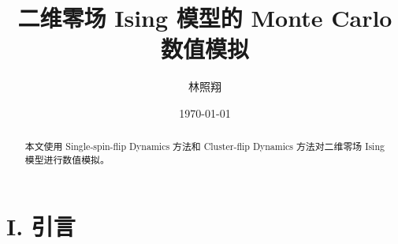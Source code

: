 \documentclass[aps,prl,twocolumn,groupedaddress]{revtex4-2}
\begin{document}

\title{二维零场 Ising 模型的 Monte Carlo 数值模拟}


\author{林照翔}


\date{\today}

\begin{abstract}
本文使用 Single-spin-flip Dynamics 方法和 Cluster-flip Dynamics 方法\cite{01}对二维零场 Ising 模型进行数值模拟。
\end{abstract}


\maketitle

\section{I. 引言}
\end{document}
